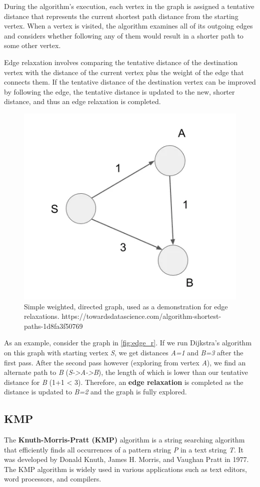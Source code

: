 \documentclass{l4proj}
\begin{document}
During the algorithm's execution, each vertex in the graph is assigned a tentative distance that represents the current shortest path distance from the starting vertex. When a vertex is visited, the algorithm examines all of its outgoing edges and considers whether following any of them would result in a shorter path to some other vertex.

Edge relaxation involves comparing the tentative distance of the destination vertex with the distance of the current vertex plus the weight of the edge that connects them. If the tentative distance of the destination vertex can be improved by following the edge, the tentative distance is updated to the new, shorter distance, and thus an edge relaxation is completed. 

\begin{figure}[!h]
    \centering
    \includegraphics[width=0.6\linewidth]{images/edge_relaxation.png}    

    \caption{Simple weighted, directed graph, used as a demonstration for edge relaxations. https://towardsdatascience.com/algorithm-shortest-paths-1d8fa3f50769}
    \label{fig:edge_r} 
\end{figure}

As an example, consider the graph in \autoref{fig:edge_r}. If we run Dijkstra's algorithm on this graph with starting vertex \emph{S}, we get distances \emph{A=1} and \emph{B=3} after the first pass. After the second pass however (exploring from vertex \emph{A}), we find an alternate path to \emph{B} (\emph{S->A->B}), the length of which is lower than our tentative distance for \emph{B} (1+1 < 3). Therefore, an \textbf{edge relaxation} is completed as the distance is updated to \emph{B=2} and the graph is fully explored.

\subsection{KMP}
\cite{a}
The \textbf{Knuth-Morris-Pratt (KMP)} algorithm is a string searching algorithm that efficiently finds all occurrences of a pattern string \emph{P} in a text string \emph{T}. It was developed by Donald Knuth, James H. Morris, and Vaughan Pratt in 1977. The KMP algorithm is widely used in various applications such as text editors, word processors, and compilers.
\end{document}
